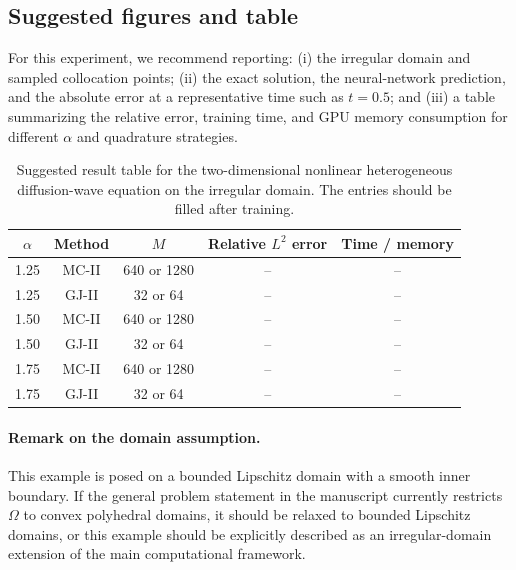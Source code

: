 \documentclass[11pt]{article}
\begin{document}
\subsection{Suggested figures and table}

For this experiment, we recommend reporting: (i) the irregular domain and sampled collocation points; (ii) the exact solution, the neural-network prediction, and the absolute error at a representative time such as $t=0.5$; and (iii) a table summarizing the relative error, training time, and GPU memory consumption for different $\alpha$ and quadrature strategies.

\begin{table}[t]
\centering
\caption{Suggested result table for the two-dimensional nonlinear heterogeneous diffusion-wave equation on the irregular domain. The entries should be filled after training.}
\label{tab:irregular-2d-results}
\begin{tabular}{ccccc}
\toprule
$\alpha$ & Method & $M$ & Relative $L^2$ error & Time / memory \\
\midrule
1.25 & MC-II & 640 or 1280 & -- & -- \\
1.25 & GJ-II & 32 or 64 & -- & -- \\
1.50 & MC-II & 640 or 1280 & -- & -- \\
1.50 & GJ-II & 32 or 64 & -- & -- \\
1.75 & MC-II & 640 or 1280 & -- & -- \\
1.75 & GJ-II & 32 or 64 & -- & -- \\
\bottomrule
\end{tabular}
\end{table}

\paragraph{Remark on the domain assumption.}
This example is posed on a bounded Lipschitz domain with a smooth inner boundary. If the general problem statement in the manuscript currently restricts $\Omega$ to convex polyhedral domains, it should be relaxed to bounded Lipschitz domains, or this example should be explicitly described as an irregular-domain extension of the main computational framework.
\end{document}
